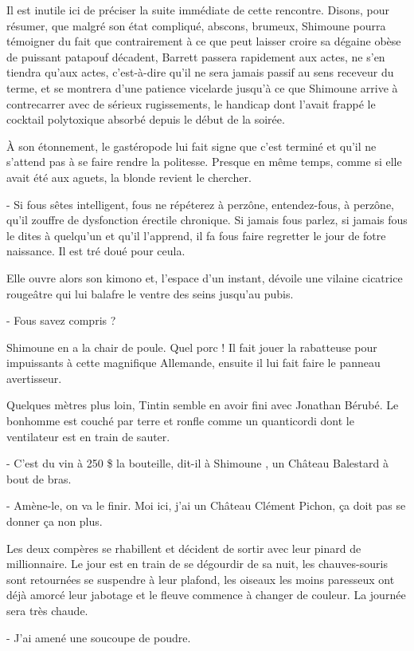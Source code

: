 Il est inutile ici de préciser la suite immédiate de cette rencontre. Disons, pour résumer, que malgré son état compliqué, abscons, brumeux, Shimoune pourra témoigner du fait que contrairement à ce que peut laisser croire sa dégaine obèse de puissant patapouf décadent, Barrett passera rapidement aux actes, ne s’en tiendra qu’aux actes, c’est-à-dire qu’il ne sera jamais passif au sens receveur du terme, et se montrera d’une patience vicelarde jusqu’à ce que Shimoune arrive à contrecarrer avec de sérieux rugissements, le handicap dont l’avait frappé le cocktail polytoxique absorbé depuis le début de la soirée.

À son étonnement, le gastéropode lui fait signe que c’est terminé et qu’il ne s’attend pas à se faire rendre la politesse. Presque en même temps, comme si elle avait été aux aguets, la blonde revient le chercher.

- Si fous sêtes intelligent, fous ne répéterez à perzône, entendez-fous, à perzône, qu’il zouffre de dysfonction érectile chronique. Si jamais fous parlez, si jamais fous le dites à quelqu’un et qu’il l’apprend, il fa fous faire regretter le jour de fotre naissance. Il est tré doué pour ceula.

Elle ouvre alors son kimono et, l’espace d’un instant, dévoile une vilaine cicatrice rougeâtre qui lui balafre le ventre des seins jusqu’au pubis.

- Fous savez compris ?

Shimoune en a la chair de poule. Quel porc ! Il fait jouer la rabatteuse pour impuissants à cette magnifique Allemande, ensuite il lui fait faire le panneau avertisseur.

Quelques mètres plus loin, Tintin semble en avoir fini avec Jonathan Bérubé. Le bonhomme est couché par terre et ronfle comme un quanticordi dont le ventilateur est en train de sauter.

- C’est du vin à 250 \$ la bouteille, dit-il à Shimoune , un Château Balestard à bout de bras.

- Amène-le, on va le finir. Moi ici, j’ai un Château Clément Pichon, ça doit pas se donner ça non plus.

Les deux compères se rhabillent et décident de sortir avec leur pinard de millionnaire. Le jour est en train de se dégourdir de sa nuit, les chauves-souris sont retournées se suspendre à leur plafond, les oiseaux les moins paresseux ont déjà amorcé leur jabotage et le fleuve commence à changer de couleur. La journée sera très chaude.

- J’ai amené une soucoupe de poudre.

